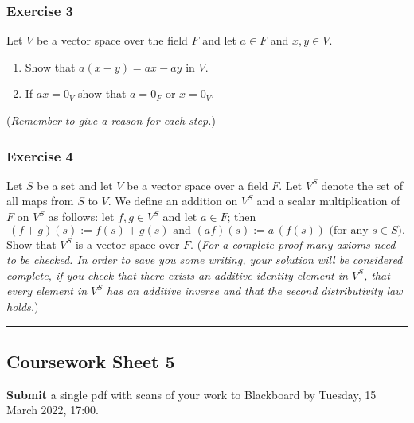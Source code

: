 \documentclass[
  12pt,
  a4paper,
  twoside]{article}
\theoremstyle{plain}
\theoremstyle{definition}
\begin{document}
\hypertarget{exercise-3-3}{%
\subsubsection*{Exercise 3}\label{exercise-3-3}}

Let \(V\) be a vector space over the field \(F\) and let \(a\in F\)
and \(x,y \in V\).

\begin{enumerate}
\def\labelenumi{(\alph{enumi})}
\item
  Show that \(a(x-y) = ax-ay\) in \(V\).
\item
  If \(ax=0_V\) show that \(a=0_F\) or \(x=0_V\).
\end{enumerate}

(\emph{Remember to give a reason for each step.})

\hypertarget{exercise-4-2}{%
\subsubsection*{Exercise 4}\label{exercise-4-2}}

Let \(S\) be a set and let \(V\) be a vector space over a field
\(F\). Let \(V^S\) denote the set of all maps from \(S\) to \(V\). We
define an addition on \(V^S\) and a scalar multiplication of \(F\)
on \(V^S\) as follows: let \(f,g \in V^S\) and let \(a \in F\); then
\[(f+g)(s) := f(s) + g(s) \textrm{ and } (af)(s) := a\, (f(s))
\textrm{ (for any } s \in S).\] Show that \(V^S\) is a vector
space over \(F\). (\emph{For a complete proof many axioms need to be checked. In order
to save you some writing, your solution will be considered complete, if you
check that there exists an additive identity element in \(V^S\), that every
element in \(V^S\) has an additive inverse and that the second distributivity law
holds.})

\begin{center}\rule{0.5\linewidth}{0.5pt}\end{center}

\hypertarget{coursework-sheet-5}{%
\subsection{Coursework Sheet 5}\label{coursework-sheet-5}}

\textbf{Submit} a single pdf with scans of your work to Blackboard by Tuesday, 15 March 2022, 17:00.
\end{document}
